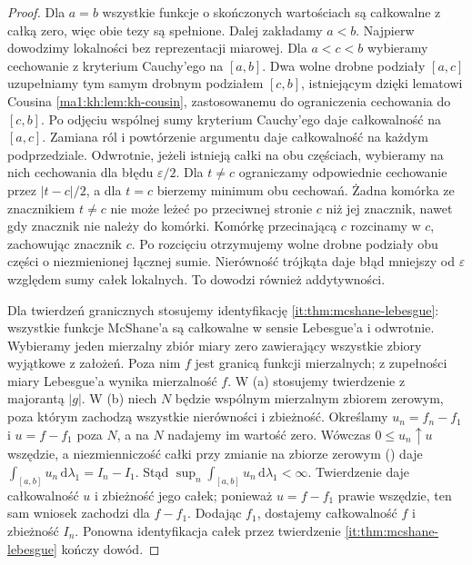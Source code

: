 \begin{proof}
Dla $a=b$ wszystkie funkcje o skończonych wartościach
są całkowalne z całką zero, więc obie tezy są spełnione.
Dalej zakładamy $a<b$.
Najpierw dowodzimy lokalności bez reprezentacji miarowej. Dla $a<c<b$ wybieramy cechowanie z kryterium Cauchy'ego na $[a,b]$. Dwa wolne drobne podziały $[a,c]$ uzupełniamy tym samym drobnym podziałem $[c,b]$, istniejącym dzięki lematowi Cousina \ref{ma1:kh:lem:kh-cousin}, zastosowanemu do ograniczenia cechowania do $[c,b]$. Po odjęciu wspólnej sumy kryterium Cauchy'ego daje całkowalność na $[a,c]$. Zamiana ról i powtórzenie argumentu daje całkowalność na każdym podprzedziale. Odwrotnie, jeżeli istnieją całki na obu częściach, wybieramy na nich cechowania dla błędu $\varepsilon/2$. Dla $t\ne c$ ograniczamy odpowiednie cechowanie przez $|t-c|/2$, a dla $t=c$ bierzemy minimum obu cechowań. Żadna komórka ze znacznikiem $t\ne c$ nie może leżeć po przeciwnej stronie $c$ niż jej znacznik, nawet gdy znacznik nie należy do komórki. Komórkę przecinającą $c$ rozcinamy w $c$, zachowując znacznik $c$. Po rozcięciu otrzymujemy wolne drobne podziały obu części o niezmienionej łącznej sumie. Nierówność trójkąta daje błąd mniejszy od $\varepsilon$ względem sumy całek lokalnych. To dowodzi również addytywności.

Dla twierdzeń granicznych stosujemy identyfikację \ref{it:thm:mcshane-lebesgue}: wszystkie funkcje McShane'a są całkowalne w sensie Lebesgue'a i odwrotnie. Wybieramy jeden mierzalny zbiór miary zero zawierający wszystkie zbiory wyjątkowe z założeń. Poza nim $f$ jest granicą funkcji mierzalnych; z zupełności miary Lebesgue'a wynika mierzalność $f$. W (a) stosujemy twierdzenie  z majorantą $|g|$. W (b) niech $N$ będzie wspólnym mierzalnym zbiorem zerowym,
poza którym zachodzą wszystkie nierówności i zbieżność.
Określamy $u_n=f_n-f_1$ i $u=f-f_1$ poza $N$,
a na $N$ nadajemy im wartość zero. Wówczas $0\le u_n\uparrow u$
wszędzie, a niezmienniczość całki przy zmianie na zbiorze zerowym
()
daje $\int_{[a,b]}u_n\,\mathrm d\lambda_1=I_n-I_1$.
Stąd $\sup_n\int_{[a,b]}u_n\,\mathrm d\lambda_1<\infty$.
Twierdzenie  daje całkowalność $u$ i zbieżność jego całek;
ponieważ $u=f-f_1$ prawie wszędzie, ten sam wniosek zachodzi dla
$f-f_1$. Dodając $f_1$, dostajemy całkowalność $f$ i zbieżność $I_n$.
Ponowna identyfikacja całek przez twierdzenie
\ref{it:thm:mcshane-lebesgue} kończy dowód.
\end{proof}
\endgroup
